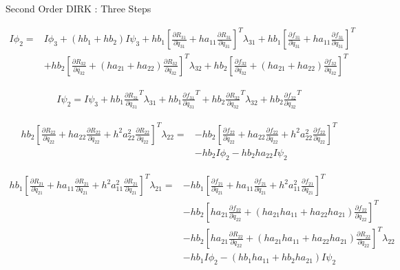 \documentclass{beamer}
\newcommand{\pd}[2]{\frac{\partial #1}{\partial #2}}
\begin{document}
\begin{frame}[allowframebreaks]{Second Order DIRK : Three Steps}
\framebreak

\begin{equation}
  \begin{split}
    I \phi_2 = & I \phi_3 + (hb_1 + hb_2) I \psi_3  + hb_1 \left[ \pd{R_{31}}{\dot{q}_{31}} + ha_{11} \pd{R_{31}}{q_{31}}  \right]^T \lambda_{31} + hb_1 \left[ \pd{f_{31}}{\dot{q}_{31}} + ha_{11} \pd{f_{31}}{{q}_{31}} \right]^T \\
               & + hb_2 \left[ \pd{R_{32}}{\dot{q_{32}}} + (ha_{21} + ha_{22}) \pd{R_{32}}{q_{32}} \right]^T \lambda_{32} + hb_2 \left[ \pd{f_{32}}{\dot{q_{32}}} + (ha_{21} + ha_{22}) \pd{f_{32}}{q_{32}} \right]^T               
  \end{split}
\end{equation}

\begin{equation}
  \begin{split}
    I \psi_2 = I \psi_3 + hb_1 \pd{R_{31}}{q_{31}}^T \lambda_{31} + hb_1 \pd{f_{31}}{q_{31}}^T  + hb_2 \pd{R_{32}}{q_{32}}^T \lambda_{32} + hb_2 \pd{f_{32}}{q_{32}}^T
  \end{split}
\end{equation}


\begin{equation}
  \begin{split}
    hb_2\left[\pd{R_{22}}{\ddot{q}_{22}} + ha_{22}\pd{R_{22}}{\dot{q}_{22}} + h^2a_{22}^2 \pd{R_{22}}{{q}_{22}} \right]^T \lambda_{22} = & - hb_2 \left[\pd{f_{22}}{\ddot{q}_{22}} + ha_{22}\pd{f_{22}}{\dot{q}_{22}} + h^2a_{22}^2 \pd{f_{22}}{{q}_{22}} \right]^T \\ 
    & - hb_2 I \phi_2 - hb_2 ha_{22} I  \psi_2
  \end{split}
\end{equation}

\begin{equation}
  \begin{split}
    hb_1\left[\pd{R_{21}}{\ddot{q}_{21}} + ha_{11}\pd{R_{21}}{\dot{q}_{21}} + h^2a_{11}^2 \pd{R_{21}}{{q}_{21}} \right]^T \lambda_{21} = & - hb_1 \left[\pd{f_{21}}{\ddot{q}_{21}} + ha_{11}\pd{f_{21}}{\dot{q}_{21}} + h^2a_{11}^2 \pd{f_{21}}{{q}_{21}} \right]^T \\ 
    & - hb_2 \left[ha_{21}\pd{f_{22}}{\dot{q}_{22}} + (ha_{21}ha_{11} + ha_{22}ha_{21}) \pd{f_{22}}{{q}_{22}} \right]^T \\
    & - hb_2 \left[ha_{21}\pd{R_{22}}{\dot{q}_{22}} + (ha_{21}ha_{11} + ha_{22}ha_{21}) \pd{R_{22}}{{q}_{22}} \right]^T\lambda_{22} \\
    & - hb_1I \phi_2  - (hb_1ha_{11} + hb_2ha_{21}) I \psi_2
  \end{split}
\end{equation}

\end{frame}
\end{document}
